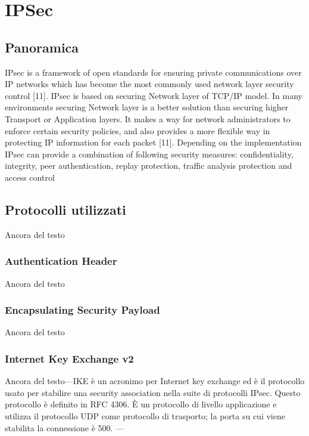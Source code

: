 

\section{IPSec}
\subsection{Panoramica}
IPsec is a framework of open standards for ensuring private communications over IP networks which has become the most commonly used network layer security control [11]. IPsec is based on securing Network layer of TCP/IP model. In many environments securing Network layer is a better solution than securing higher Transport or Application layers. It makes a way for network administrators to enforce certain security policies, and also provides a more flexible way in protecting IP information for each packet [11]. Depending on the implementation IPsec can provide a combination of following security measures: confidentiality, integrity, peer authentication, replay protection, traffic analysis protection and access control
\subsection{Protocolli utilizzati}
Ancora del testo

\subsubsection{Authentication Header}
Ancora del testo

\subsubsection{Encapsulating Security Payload}
Ancora del testo

\subsubsection{Internet Key Exchange v2}
Ancora del testo---IKE è un acronimo per Internet key exchange ed è il protocollo usato per stabilire una security association nella suite di protocolli IPsec. Questo protocollo è definito in RFC 4306. È un protocollo di livello applicazione e utilizza il protocollo UDP come protocollo di trasporto; la porta su cui viene stabilita la connessione è 500. ---

